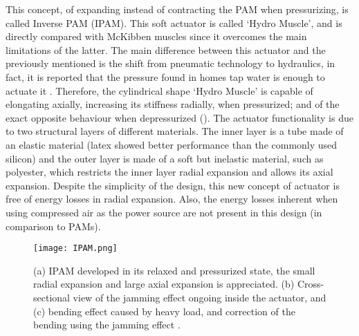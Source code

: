 This concept, of expanding instead of contracting the PAM when pressurizing, is called Inverse PAM (IPAM). This soft actuator is called `Hydro Muscle', and is directly compared with McKibben muscles since it overcomes the main limitations of the latter. The main difference between this actuator and the previously mentioned is the shift from pneumatic technology to hydraulics, in fact, it is reported that the pressure found in homes tap water is enough to actuate it \cite{Sridar2016}. Therefore, the cylindrical shape `Hydro Muscle' is capable of elongating axially, increasing its stiffness radially, when pressurized; and of the exact opposite behaviour when depressurized (). The actuator functionality is due to two structural layers of different materials. The inner layer is a tube made of an elastic material (latex showed better performance than the commonly used silicon) and the outer layer is made of a soft but inelastic material, such as polyester, which restricts the inner layer radial expansion and allows its axial expansion. Despite the simplicity of the design, this new concept of actuator is free of energy losses in radial expansion. Also, the energy losses inherent when using compressed air as the power source are not present in this design (in comparison to PAMs).
\begin{figure}[hbtp!]
    \centering
    \texttt{[image: IPAM.png]}
    \caption{(a) IPAM developed in its relaxed and pressurized state, the small radial expansion and large axial expansion is appreciated. (b) Cross-sectional view of the jamming effect ongoing inside the actuator, and (c) bending effect caused by heavy load, and correction of the bending using the jamming effect \cite{Sridar2016}. }
    \label{fig:IPAM}
\end{figure}

